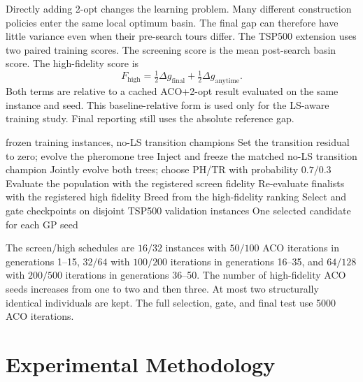 \documentclass[letterpaper,journal]{IEEEtran}
\begin{document}
Directly adding 2-opt changes the learning problem.
Many different construction policies enter the same local optimum basin.
The final gap can therefore have little variance even when their pre-search
tours differ.
The TSP500 extension uses two paired training scores.
The screening score is the mean post-search basin score.
The high-fidelity score is
\begin{equation}
 F_{\mathrm{high}}
 =\tfrac12\Delta g_{\mathrm{final}}
 +\tfrac12\Delta g_{\mathrm{anytime}} .
 \label{eq:ls-fitness}
\end{equation}
Both terms are relative to a cached ACO+2-opt result evaluated on the same
instance and seed.
This baseline-relative form is used only for the LS-aware training study.
Final reporting still uses the absolute reference gap.

\begin{algorithm}[t]
\caption{Three-stage TSP500 LS-aware evolution}
\label{alg:ls-training}
\begin{algorithmic}[1]
 frozen training instances, no-LS transition champions
        \STATE Set the transition residual to zero; evolve the pheromone tree
        \STATE Inject and freeze the matched no-LS transition champion
    \ELSE
        \STATE Jointly evolve both trees; choose PH/TR with probability \(0.7/0.3\)
    \ENDIF
    \STATE Evaluate the population with the registered screen fidelity
    \STATE Re-evaluate finalists with the registered high fidelity
    \STATE Breed from the high-fidelity ranking
\ENDFOR
\STATE Select and gate checkpoints on disjoint TSP500 validation instances
\RETURN One selected candidate for each GP seed
\end{algorithmic}
\end{algorithm}

The screen/high schedules are \(16/32\) instances with \(50/100\) ACO
iterations in generations 1--15, \(32/64\) with \(100/200\) iterations in
generations 16--35, and \(64/128\) with \(200/500\) iterations in generations
36--50.
The number of high-fidelity ACO seeds increases from one to two and then
three.
At most two structurally identical individuals are kept.
The full selection, gate, and final test use 5000 ACO iterations.

\section{Experimental Methodology}
\end{document}
